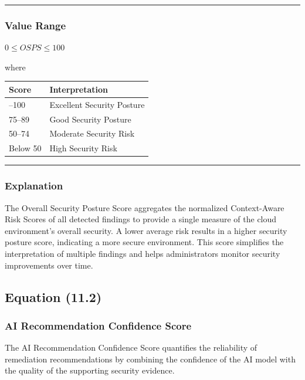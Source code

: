 \begin{center}\rule{0.5\linewidth}{0.5pt}\end{center}

\subsubsection{Value Range}

$0 \leq OSPS \leq 100$

where

\begin{longtable}[]{@{}ll@{}}
\toprule\noalign{}
Score & Interpretation \\
\midrule\noalign{}
\endhead
\bottomrule\noalign{}
\endlastfoot
90--100 & Excellent Security Posture \\
75--89 & Good Security Posture \\
50--74 & Moderate Security Risk \\
Below 50 & High Security Risk \\
\end{longtable}

\begin{center}\rule{0.5\linewidth}{0.5pt}\end{center}

\subsubsection{Explanation}

The Overall Security Posture Score aggregates the normalized Context-Aware Risk Scores of all detected findings to provide a single measure of the cloud environment's overall security. A lower average risk results in a higher security posture score, indicating a more secure environment. This score simplifies the interpretation of multiple findings and helps administrators monitor security improvements over time.

\subsection{Equation (11.2)}

\subsubsection{AI Recommendation Confidence Score}

The AI Recommendation Confidence Score quantifies the reliability of remediation recommendations by combining the confidence of the AI model with the quality of the supporting security evidence.

